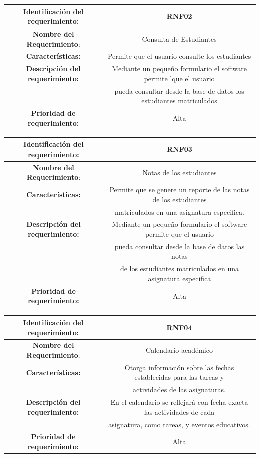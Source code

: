\documentclass[11pt]{article}
\begin{document}
\begin{tabular}{|c|c|} 
\hline
\textbf{Identificación del requerimiento:} & RNF02  \\
\hline
\textbf{Nombre del Requerimiento}: & Consulta de Estudiantes \\
\hline
\textbf{Características:} & Permite que el usuario consulte los
estudiantes\\
\hline
\textbf{Descripción del requerimiento:} & Mediante un pequeño
formulario el software permite lque el usuario \\ & pueda consultar
desde la  base de datos los  estudiantes matriculados \\
\hline
\textbf{Prioridad de requerimiento:} & Alta \\
\hline

\end{tabular}

\vspace{15pt}

\begin{tabular}{|c|c|} 
\hline
\textbf{Identificación del requerimiento:} & RNF03  \\
\hline
\textbf{Nombre del Requerimiento}: & Notas de los estudiantes \\
\hline
\textbf{Características:} & Permite que se genere un reporte de las
notas de los estudiantes \\ & matriculados en una asignatura 
especifica.\\
\hline
\textbf{Descripción del requerimiento:} & Mediante un pequeño
formulario el software permite  que el usuario\\ & pueda consultar
desde la base de datos  las notas\\ & de los estudiantes 
matriculados en una asignatura especifica \\
\hline
\textbf{Prioridad de requerimiento:} & Alta \\
\hline

\end{tabular}

\vspace{15pt}

\begin{tabular}{|c|c|} 
\hline
\textbf{Identificación del requerimiento:} & RNF04  \\
\hline
\textbf{Nombre del Requerimiento}: & Calendario académico \\
\hline
\textbf{Características:} & Otorga información sobre las fechas establecidas para las tareas y \\ & actividades de las asignaturas.\\
\hline
\textbf{Descripción del requerimiento:} & En el calendario se reflejará con fecha exacta las actividades de cada\\ & asignatura, como tareas, y eventos educativos. \\
\hline
\textbf{Prioridad de requerimiento:} & Alta \\
\hline

\end{tabular}
\end{document}
